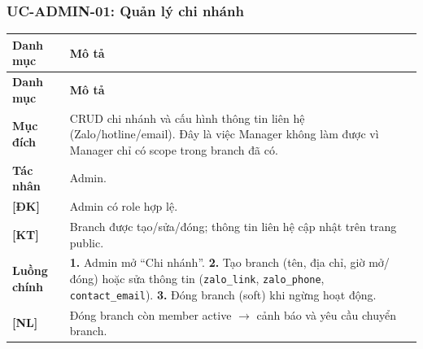 \subsubsection{UC-ADMIN-01: Quản lý chi nhánh}
\begingroup
\renewcommand{\arraystretch}{1.3}
\begin{longtable}{|>{\centering\arraybackslash}m{3cm}|>{\raggedright\arraybackslash}m{12cm}|}
\hline
\textbf{Danh mục} & \textbf{Mô tả} \\ \hline
\endfirsthead
\hline
\textbf{Danh mục} & \textbf{Mô tả} \\ \hline
\endhead
\hline
\endfoot
\textbf{Mục đích} & CRUD chi nhánh và cấu hình thông tin liên hệ (Zalo/hotline/email). Đây là việc Manager không làm được vì Manager chỉ có scope trong branch đã có. \\
\hline
\textbf{Tác nhân} & Admin. \\
\hline
\textbf{[ĐK]} & Admin có role hợp lệ. \\
\hline
\textbf{[KT]} & Branch được tạo/sửa/đóng; thông tin liên hệ cập nhật trên trang public. \\
\hline
\textbf{Luồng chính} & \textbf{1.} Admin mở ``Chi nhánh''. \textbf{2.} Tạo branch (tên, địa chỉ, giờ mở/đóng) hoặc sửa thông tin (\texttt{zalo\_link}, \texttt{zalo\_phone}, \texttt{contact\_email}). \textbf{3.} Đóng branch (soft) khi ngừng hoạt động. \\
\hline
\textbf{[NL]} & Đóng branch còn member active $\rightarrow$ cảnh báo và yêu cầu chuyển branch. \\
\hline
\end{longtable}
\endgroup

